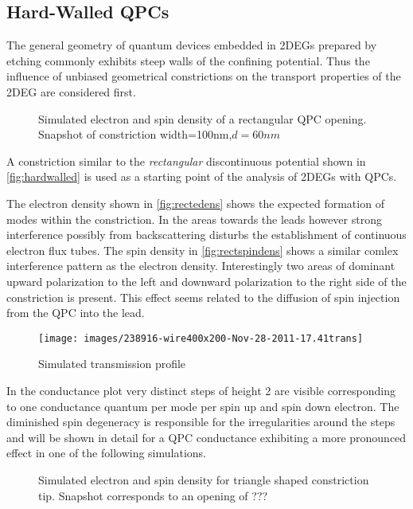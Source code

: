 \subsection{Hard-Walled QPCs}
The general geometry of quantum devices embedded in 2DEGs prepared by etching commonly exhibits steep walls of the confining potential. Thus the influence of unbiased geometrical constrictions on the transport properties of the 2DEG are considered first.
\begin{figure}[h]
\caption{Simulated electron and spin density of a rectangular QPC opening. Snapshot of constriction width=100nm,$d=60nm$}
\end{figure}
A constriction similar to the \emph{rectangular} discontinuous potential shown in \cref{fig:hardwalled} is used as a starting point of the analysis of 2DEGs with QPCs.\par
The electron density shown in \cref{fig:rectedens} shows the expected formation of modes within the constriction. In the areas towards the leads however strong interference possibly from backscattering disturbs the establishment of continuous electron flux tubes. The spin density in \cref{fig:rectspindens} shows a similar comlex interference pattern as the electron density. Interestingly two areas of dominant upward polarization to the left and downward polarization to the right side of the constriction is present. This effect seems related to the diffusion of spin injection from the QPC into the lead.\par
\begin{figure}[h]
\centering
\texttt{[image: images/238916-wire400x200-Nov-28-2011-17.41trans]}
\caption{Simulated transmission profile}
\end{figure}
In the conductance plot very distinct steps of height 2 are visible corresponding to one conductance quantum per mode per spin up and spin down electron. The diminished spin degeneracy is responsible for the irregularities around the steps and will be shown in detail for a QPC conductance exhibiting a more pronounced effect in one of the following simulations.\par
\begin{figure}[h]
\caption{Simulated electron and spin density for triangle shaped constriction tip. Snapshot corresponds to an opening of ???}
\end{figure}
